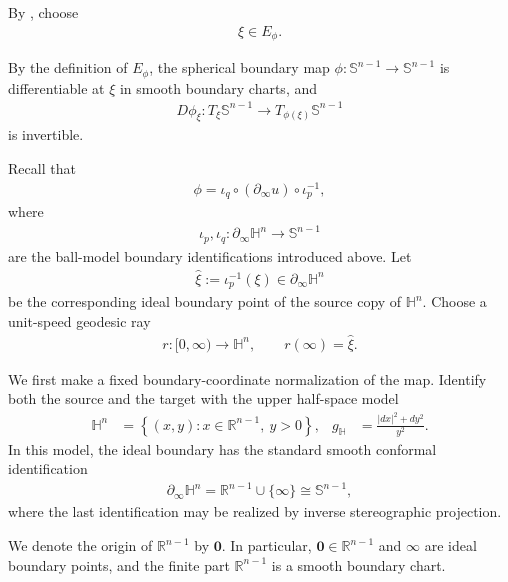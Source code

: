 \documentclass[11pt]{amsart}
\theoremstyle{plain}
\theoremstyle{plain}
\theoremstyle{plain}
\newcommand{\Hn}{\mathbb H^n}
\newcommand{\bdry}{\partial_\infty}
\newcommand{\R}{\mathbb R}
\numberwithin{equation}{section}
\begin{document}
By , choose
\begin{align}
\xi\in E_\phi.
\nonumber
\end{align}

By the definition of \(E_\phi\), the spherical boundary map
\(\phi:\mathbb S^{n-1}\to\mathbb S^{n-1}\) is differentiable at
\(\xi\) in smooth boundary charts, and
\begin{align}
D\phi_\xi:
T_\xi\mathbb S^{n-1}
\longrightarrow
T_{\phi(\xi)}\mathbb S^{n-1}
\nonumber
\end{align}
is invertible.

Recall that
\begin{align}
\phi
=
\iota_q\circ(\bdry u)\circ\iota_p^{-1},
\nonumber
\end{align}
where
\begin{align}
\iota_p,\iota_q:
\bdry\Hn\longrightarrow\mathbb S^{n-1}
\nonumber
\end{align}
are the ball-model boundary identifications introduced above.  Let
\begin{align}
\widehat\xi
:=
\iota_p^{-1}(\xi)
\in\bdry\Hn
\nonumber
\end{align}
be the corresponding ideal boundary point of the source copy of
\(\Hn\).  Choose a unit-speed geodesic ray
\begin{align}
r:[0,\infty)\longrightarrow\Hn,
\qquad
r(\infty)=\widehat\xi.
\nonumber
\end{align}

We first make a fixed boundary-coordinate normalization of the map.
Identify both the source and the target with
the upper half-space model
\begin{align}
\Hn
&=
\left\{
(x,y):x\in\R^{n-1},\ y>0
\right\},
&
g_{\mathbb H}
&=
\frac{|dx|^2+dy^2}{y^2}.
\nonumber
\end{align}
In this model, the ideal boundary has the standard smooth conformal
identification
\begin{align}
\bdry\Hn
=
\R^{n-1}\cup\{\infty\}
\cong
\mathbb S^{n-1},
\nonumber
\end{align}
where the last identification may be realized by inverse stereographic
projection.  

We denote the origin of \(\R^{n-1}\) by
\(\mathbf{0}\). In particular, \(\mathbf{0}\in\R^{n-1}\) and \(\infty\) are ideal
boundary points, and the finite part \(\R^{n-1}\) is a smooth boundary
chart.
\end{document}
